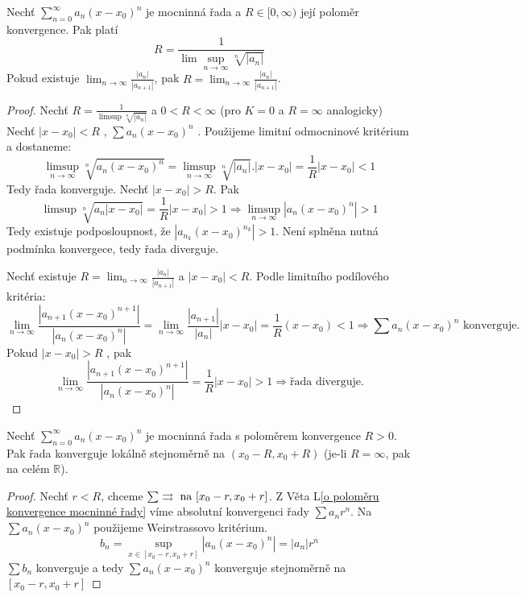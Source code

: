 \begin{vetal}
Nechť $\sum_{n=0}^{\infty} a_n (x-x_0)^n$ je mocninná řada a $R \in [ 0, \infty)$ její poloměr konvergence. Pak platí
$$R = \frac{1}{ \lim \sup_{n \rightarrow \infty} \sqrt[n]{| a_n |} }$$
Pokud existuje $\lim_{n \rightarrow \infty} \frac{|a_n|}{|a_{n+1}|}$, pak $R = \lim_{n \rightarrow \infty} \frac{|a_n|}{|a_{n+1}|}$.
\end{vetal}

\begin{proof}
Nechť $R = \frac{1}{\limsup \sqrt[n]{|a_n|}}$ a $0<R<\infty$ (pro $K = 0$ a $R = \infty$ analogicky)
Nechť $|x-x_0| < R$ , $\sum a_n(x-x_0)^n$ . Použijeme limitní odmocninové kritérium a dostaneme:
$$\limsup_{n \to \infty} \sqrt[n]{a_n(x-x_0)^n} = \limsup_{n \to \infty} \sqrt[n]{|a_n|} . |x-x_0| = \frac{1}{R} |x-x_0| < 1$$
Tedy řada konverguje.
Nechť $|x-x_0|>R$. Pak 
$$\limsup \sqrt[n]{a_n|x-x_0|} = \frac{1}{R}|x-x_0| > 1 \Rightarrow \limsup_{n \to \infty} |a_n(x-x_0)^n| > 1$$
Tedy existuje podposloupnost, že $|a_{n_k} (x-x_0)^{n_k}| > 1$. Není splněna nutná podmínka konvergece, tedy řada diverguje.

Nechť existuje $R = \lim_{n \to \infty } \frac{|a_n|}{|a_{n+1}|}$ a $|x-x_0|< R$. Podle limitního podílového kritéria:
$$\lim_{n \to \infty} \frac{|a_{n+1}(x-x_0)^{n+1}|}{|a_n(x-x_0)^n|} = \lim_{n \to \infty} \frac{|a_{n+1}|}{|a_n|} |x-x_0| = \frac{1}{R} (x-x_0) < 1 \Rightarrow \sum a_n(x-x_0)^n \textrm{ konverguje.}$$
Pokud $|x-x_0| > R$ , pak 
$$\lim_{n \to \infty} \frac{|a_{n+1}(x-x_0)^{n+1}|}{|a_n(x-x_0)^n|} = \frac{1}{R}|x-x_0|>1 \Rightarrow \textrm{řada diverguje.}$$
\end{proof}

\begin{vetal}
\label{o stejnoměrné konvergenci mocninné řady}
Nechť $\sum_{n=0}^{\infty} a_n (x-x_0)^n$ je mocninná řada s poloměrem konvergence $R > 0$.  Pak řada konverguje lokálně stejnoměrně na $(x_0 - R, x_0 + R)$ (je-li $R=\infty$, pak na celém $\mathbb{R}$).
\end{vetal}

\begin{proof}
Nechť $r < R$, chceme $\sum \rightrightarrows \textrm{ na } [x_0-r,x_0+r]$. Z Věta L\ref{o poloměru konvergence mocninné řady} víme absolutní konvergenci řady $\sum a_n r^n$. Na $ \sum a_n(x-x_0)^n$ použijeme Weirstrassovo kritérium.
$$b_n = \sup_{x \in[x_0-r, x_0+r]} |a_n(x-x_0)^n| = |a_n|r^n$$
$\sum b_n$ konverguje a tedy $\sum a_n (x-x_0)^n$ konverguje stejnoměrně na $[x_0-r, x_0+r]$
\end{proof}


